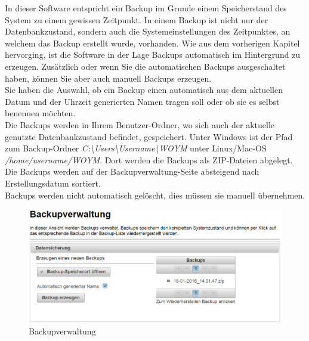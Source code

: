 \documentclass[fontsize=12pt]{scrartcl}
\begin{document}
In dieser Software entspricht ein Backup im Grunde einem Speicherstand des System zu einem gewissen Zeitpunkt. In einem Backup ist nicht nur der Datenbankzustand, sondern auch die Systemeinstellungen des Zeitpunktes, an welchem das Backup erstellt wurde, vorhanden. Wie aus dem vorherigen Kapitel hervorging, ist die Software in der Lage Backups automatisch im Hintergrund zu erzeugen. Zusätzlich oder wenn Sie die automatischen Backups ausgeschaltet haben, können Sie aber auch manuell Backups erzeugen. \\
Sie haben die Auswahl, ob ein Backup einen automatisch aus dem aktuellen Datum und der Uhrzeit generierten Namen tragen soll oder ob sie es selbst benennen möchten.\\
Die Backups werden in Ihrem Benutzer-Ordner, wo sich auch der aktuelle genutzte Datenbankzustand befindet, gespeichert. Unter Windows ist der Pfad zum Backup-Ordner \textit{C:\textbackslash{}Users\textbackslash{}Username\textbackslash{}WOYM} unter Linux/Mac-OS \textit{/home/username/WOYM}. Dort werden die Backups als ZIP-Dateien abgelegt.\\
Die Backups werden auf der Backupverwaltung-Seite absteigend nach Erstellungsdatum sortiert.\\
Backups werden nicht automatisch gelöscht, dies müssen sie manuell übernehmen.

\begin{figure}[H]
\includegraphics[width=\textwidth]{images/backupManagement.png}
\caption{Backupverwaltung}
\end{figure}
\end{document}
